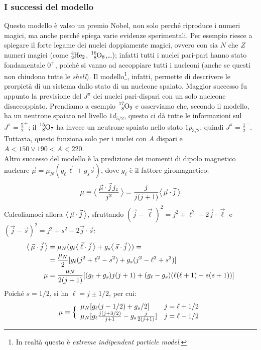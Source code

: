\subsubsection{I successi del modello} 
Questo modello è valso un premio Nobel, non solo perché riproduce i numeri magici, ma anche perché spiega varie evidenze sperimentali. Per esempio riesce a spiegare il forte legame dei nuclei doppiamente magici, ovvero con sia $N$ che $Z$ numeri magici (come $\ce{^4_2He_2}$, $\ce{^{16}_8O_8}$,\dots); infatti tutti i nuclei pari-pari hanno stato fondamentale $0^+$, poiché si vanno ad accoppiare tutti i nucleoni (anche se questi non chiudono tutte le \textit{shell}). Il modello\footnote{In realtà questo è \textit{extreme indipendent particle model}.}, infatti, permette di descrivere le prorpietà di un sistema dallo stato di un nucleone spaiato.
Maggior successo fu appunto la previsione del $J^\pi$ dei nuclei pari-dispari con un solo nucleone disaccoppiato. Prendiamo a esempio $\ce{^{17}_8O_9}$ e osserviamo che, secondo il modello, ha un neutrone spaiato nel livello $1d_{5/2}$, questo ci dà tutte le informazioni sul $J^\pi=\frac{5}{2}^+$; il $\ce{^15_8O_7}$ ha invece un neutrone spaiato nello stato $1p_{3/2}$, quindi $J^\pi = \frac{1}{2}^-$. Tuttavia, questo funziona solo per i nuclei con $A$ dispari e $A<150 \vee 190<A<220$.\\
Altro successo del modello è la predizione dei momenti di dipolo magnetico nucleare $\vec{\mu} = \mu_N (g_\ell \vec{\ell}+g_s \vec{s})$, dove $g_\ell$ è il fattore giromagnetico:
$$\mu \equiv \bigl\langle\, \frac{\vec{\mu}\cdot\vec{j}\, j_z}{j^2}\, \bigr\rangle = \frac{j}{j(j+1)}\bigl\langle\, \vec{\mu}\cdot\vec{j}\, \bigr\rangle$$
Calcoliamoci allora $\bigl\langle\, \vec{\mu}\cdot\vec{j}\, \bigr\rangle$, sfruttando $(\vec{j}-\vec{\ell})^2 = j^2 + \ell^2 -2\vec{j}\cdot\vec{\ell}$ e $(\vec{j}-\vec{s})^2 = j^2 + s^2 - 2\vec{j}\cdot\vec{s}$:
\begin{displaymath}
\begin{aligned}
\bigl\langle\, \vec{\mu}\cdot\vec{j}\, \bigr\rangle &= \mu_N (g_\ell \bigl\langle\, \vec{\ell}\cdot\vec{j}\, \bigr\rangle +g_s \bigl\langle\, \vec{s}\cdot\vec{j}\, \bigr\rangle) = \\
&= \frac{\mu_N}{2} [g_\ell (j^2 + \ell^2 - s^2) + g_s (j^2-\ell^2+s^2) ] \\
\mu &= \frac{\mu_N}{2(j+1)} [(g_\ell+g_s) j(j+1) + (g_\ell-g_s) (\ell(\ell+1)-s(s+1))]
\end{aligned}
\end{displaymath}
Poiché $s=1/2$, si ha $\ell=j\pm 1/2$, per cui:
$$\mu = \Bigl \{
\begin{array}{ll}
    \mu_N [g_\ell (j-1/2)+g_s/2] & j = \ell+1/2 \\
    \mu_N [g_\ell \frac{j(j+3/2)}{j+1}- g_s \frac{j}{2(j+1)}] & j = \ell -1/2 
\end{array}$$
